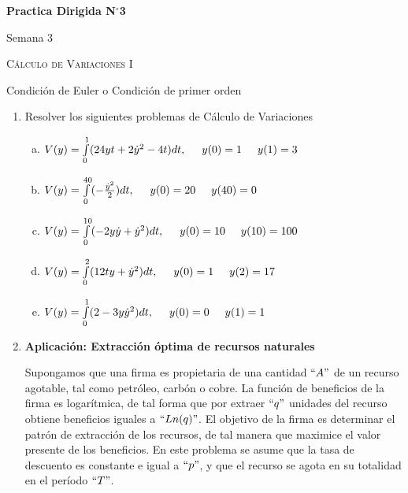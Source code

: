 \documentclass[11pt,a4paper]{article}
\begin{document}
\begin{center}
	{\Large {\textbf{Practica Dirigida N$^{\circ}$3}}}
	
	\small{Semana 3}
	
	\textsc{Cálculo de Variaciones I}
	
	Condición de Euler o Condición de primer orden
	
\end{center}

	\begin{enumerate}
		\item Resolver los siguientes problemas de Cálculo de Variaciones
			\begin{enumerate}[a)]
				\item $V(y)=\int\limits_{0}^{1}(24yt+2\dot{y}^2-4t)dt,\hspace{0.5cm} y(0)=1 \hspace{0.5cm} y(1)=3$
				\item $V(y)=\int\limits_{0}^{40}(-\frac{\dot{y}^2}{2})dt,\hspace{0.5cm} y(0)=20 \hspace{0.5cm} y(40)=0$
				\item $V(y)=\int\limits_{0}^{10}(-2y\dot{y}+\dot{y}^2)dt,\hspace{0.5cm} y(0)=10 \hspace{0.5cm} y(10)=100$
				\item $V(y)=\int\limits_{0}^{2}(12ty+\dot{y}^2)dt,\hspace{0.5cm} y(0)=1 \hspace{0.5cm} y(2)=17$
				\item $V(y)=\int\limits_{0}^{1}(2-3y\dot{y}^2)dt,\hspace{0.5cm} y(0)=0 \hspace{0.5cm} y(1)=1$
			\end{enumerate}
		
		\item \textbf{Aplicación: Extracción óptima de recursos naturales}\

			Supongamos que una firma es propietaria de una cantidad $``A"$ de un recurso agotable, tal como petróleo, carbón o cobre. La función de beneficios de la firma es logarítmica, de tal forma que por extraer $``q"$ unidades del recurso obtiene beneficios iguales a $``Ln(q)"$. El objetivo de la firma es determinar el patrón de extracción de los recursos, de tal manera que maximice el valor presente de los beneficios. En este problema se asume que la tasa de descuento es constante e igual a $``p"$, y que el recurso se agota en su totalidad en el período $``T"$.


\end{enumerate}
\end{document}
